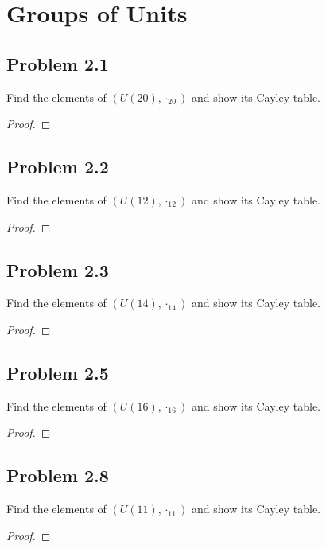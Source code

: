 \documentclass{amsbook}
\begin{document}
		\section{Groups of Units}
		\label{sec:groups_of_units}
			\subsection*{Problem 2.1}
			\label{sub:problem_2_1}
			Find the elements of $(U(20), \cdot_{20})$ and show its Cayley table.
			\begin{proof}
			\end{proof}

			\subsection*{Problem 2.2}
			\label{sub:problem_2_2}
			Find the elements of $(U(12), \cdot_{12})$ and show its Cayley table.
			\begin{proof}
			\end{proof}

			\subsection*{Problem 2.3}
			\label{sub:problem_2_3}
			Find the elements of $(U(14), \cdot_{14})$ and show its Cayley table.
			\begin{proof}
			\end{proof}

			\subsection*{Problem 2.5}
			\label{sub:problem_2_5}
			Find the elements of $(U(16), \cdot_{16})$ and show its Cayley table.
			\begin{proof}
			\end{proof}

			\subsection*{Problem 2.8}
			\label{sub:problem_2_8}
			Find the elements of $(U(11), \cdot_{11})$ and show its Cayley table.
			\begin{proof}
			\end{proof}
\end{document}

